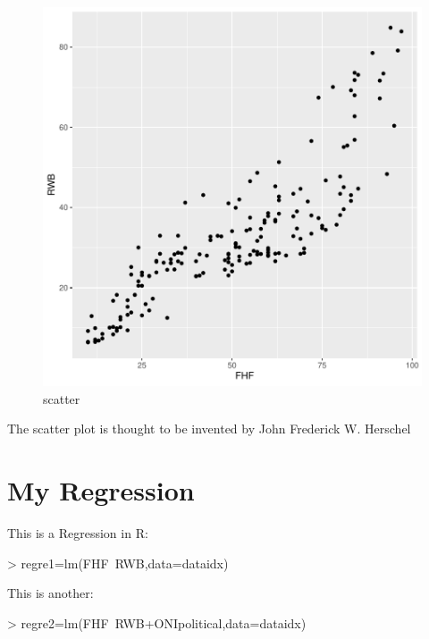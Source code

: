 \documentclass[11pt]{article}
\begin{document}
\begin{figure}[h]
\centering
\begin{adjustbox}{width=7cm,height=5.5cm}
\includegraphics{PaperInR_8-numnum_plot}
\end{adjustbox}
\caption{scatter}  
\label{numnum_plot} 
\end{figure}



The scatter plot is thought to be invented by  John Frederick W. Herschel \cite{friendly_early_2005}

\section{My Regression}\label{regre}

This is a Regression in R:

\begin{Schunk}
\begin{Sinput}
> regre1=lm(FHF~RWB,data=dataidx)
\end{Sinput}
\end{Schunk}

This is another:

\begin{Schunk}
\begin{Sinput}
> regre2=lm(FHF~RWB+ONIpolitical,data=dataidx)
\end{Sinput}
\end{Schunk}
\end{document}
